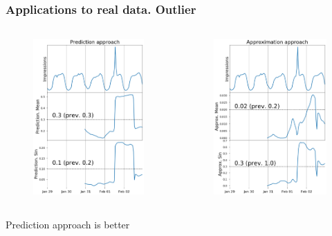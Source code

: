 \documentclass[intlimits, 9pt, unicode]{beamer}
\begin{document}
\begin{frame}
    \frametitle{Applications to real data. Outlier}
  \begin{columns}[T,onlytextwidth]
	\begin{figure}
	\includegraphics[height=6cm]{images/methods_comparison_2_1}
	\end{figure}
	
	\begin{figure}
	\includegraphics[height=6cm]{images/methods_comparison_2_2}
	\end{figure}
	
     \end{columns}
     
 \medskip
    \qquad Prediction approach is better

\end{frame}
\end{document}
